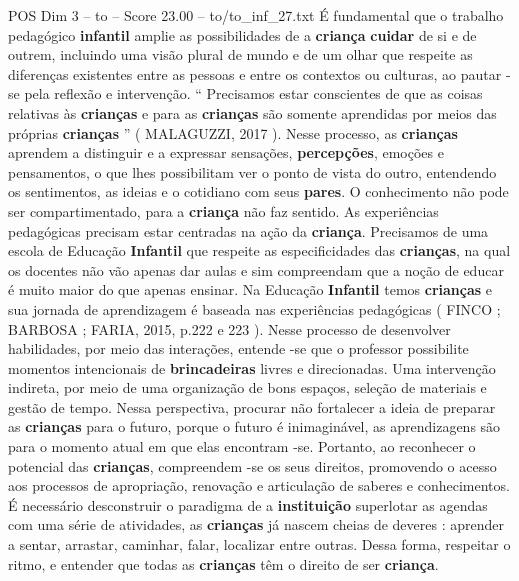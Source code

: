 \begin{textsample}{POS Dim 3 – to – Score 23.00 – to/to\_inf\_27.txt}
É fundamental que o trabalho pedagógico \textbf{infantil} amplie as possibilidades de a \textbf{criança} \textbf{cuidar} de si e de outrem, incluindo uma visão plural de mundo e de um olhar que respeite as diferenças existentes entre as pessoas e entre os contextos ou culturas, ao pautar -se pela reflexão e intervenção. “ Precisamos estar conscientes de que as coisas relativas às \textbf{crianças} e para as \textbf{crianças} são somente aprendidas por meios das próprias \textbf{crianças} ” ( MALAGUZZI, 2017 ).
Nesse processo, as \textbf{crianças} aprendem a distinguir e a expressar sensações, \textbf{percepções}, emoções e pensamentos, o que lhes possibilitam ver o ponto de vista do outro, entendendo os sentimentos, as ideias e o cotidiano com seus \textbf{pares}.
O conhecimento não pode ser compartimentado, para a \textbf{criança} não faz sentido.
As experiências pedagógicas precisam estar centradas na ação da \textbf{criança}.
Precisamos de uma escola de Educação \textbf{Infantil} que respeite as especificidades das \textbf{crianças}, na qual os docentes não vão apenas dar aulas e sim compreendam que a noção de educar é muito maior do que apenas ensinar.
Na Educação \textbf{Infantil} temos \textbf{crianças} e sua jornada de aprendizagem é baseada nas experiências pedagógicas ( FINCO ; BARBOSA ; FARIA, 2015, p.222 e 223 ).
Nesse processo de desenvolver habilidades, por meio das interações, entende -se que o professor possibilite momentos intencionais de \textbf{brincadeiras} livres e direcionadas.
Uma intervenção indireta, por meio de uma organização de bons espaços, seleção de materiais e gestão de tempo.
Nessa perspectiva, procurar não fortalecer a ideia de preparar as \textbf{crianças} para o futuro, porque o futuro é inimaginável, as aprendizagens são para o momento atual em que elas encontram -se.
Portanto, ao reconhecer o potencial das \textbf{crianças}, compreendem -se os seus direitos, promovendo o acesso aos processos de apropriação, renovação e articulação de saberes e conhecimentos.
É necessário desconstruir o paradigma de a \textbf{instituição} superlotar as agendas com uma série de atividades, as \textbf{crianças} já nascem cheias de deveres : aprender a sentar, arrastar, caminhar, falar, localizar entre outras.
Dessa forma, respeitar o ritmo, e entender que todas as \textbf{crianças} têm o direito de ser \textbf{criança}.

\end{textsample}
